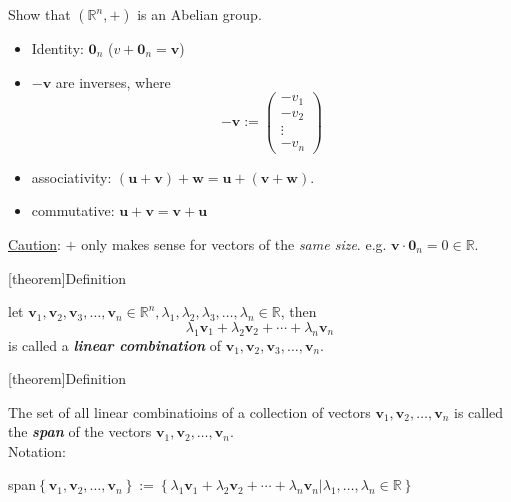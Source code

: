 \documentclass[12pt]{report}
\theoremstyle{definition}
\begin{document}
\begin{ex}
    Show that $(\mathbb{R}^{n}, +)$ is an Abelian group.
    \begin{itemize}
        \item Identity: $\pmb{0}_n$ ($v + \pmb{0}_n = \pmb{v}$)
        \item $-\pmb{v}$ are inverses, where \[
            -\pmb{v} := \begin{pmatrix}
                    -v_1\\
                    -v_2\\
                    \vdots\\
                    -v_n
            \end{pmatrix}
        \]
        \item associativity: $(\pmb{u} + \pmb{v}) + \pmb{w} = \pmb{u} + (\pmb{v} + \pmb{w})$.
        \item commutative: $\pmb{u} + \pmb{v} = \pmb{v} + \pmb{u}$
    \end{itemize}
    \underline{Caution}: $+$ only makes sense for vectors of the \emph{same size}.
    e.g. $\pmb{v} \cdot \pmb{0}_n = 0 \in \mathbb{R}$.
\end{ex}

[theorem]{Definition}
\begin{combination of add and scalar multi}
    let $\pmb{v}_1, \pmb{v}_2, \pmb{v}_3, \ldots, \pmb{v}_n \in \mathbb{R}^{n}, \lambda_1, \lambda_2, \lambda_3, \ldots, \lambda_n \in \mathbb{R}$,
    then \[
        \lambda_1 \pmb{v}_1 + \lambda_2 \pmb{v}_2 + \cdots + \lambda_n \pmb{v}_n
    \]is called a \textbf{\emph{linear combination}} of $\pmb{v}_1, \pmb{v}_2, \pmb{v}_3, \ldots, \pmb{v}_n$.
\end{combination of add and scalar multi}

[theorem]{Definition}
\begin{span of vectors}
    The set of all linear combinatioins of a collection of vectors $\pmb{v}_1, \pmb{v}_2, \ldots, \pmb{v}_n$
    is called the \textbf{\emph{span}} of the vectors $\pmb{v}_1, \pmb{v}_2, \ldots, \pmb{v}_n$.
    \\Notation: 
    
    span$\left\{\pmb{v}_1, \pmb{v}_2,\ldots,\pmb{v}_n\right\} := 
    \left\{\lambda_1 \pmb{v}_1 + \lambda_2 \pmb{v}_2 + \cdots + \lambda_n \pmb{v}_n 
    | \lambda_1, \ldots, \lambda_n \in \mathbb{R}\right\}$
\end{span of vectors}
\end{document}
